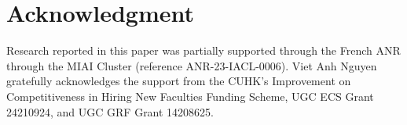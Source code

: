 \documentclass{article}
\theoremstyle{plain}
\theoremstyle{definition}
\theoremstyle{remark}
\begin{document}
\section*{Acknowledgment}
Research reported in this paper was partially supported through the French ANR through the MIAI Cluster (reference ANR-23-IACL-0006). Viet Anh Nguyen gratefully acknowledges the support from the CUHK’s Improvement on Competitiveness in Hiring New Faculties Funding Scheme, UGC ECS Grant 24210924, and UGC GRF Grant 14208625.





\newpage

\end{document}
